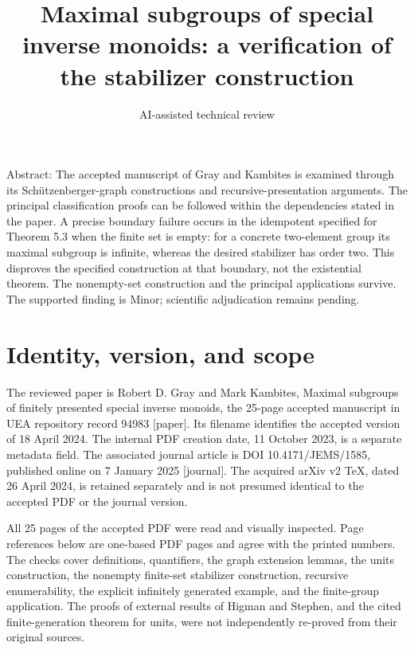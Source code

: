 \documentclass[10pt]{article}
\title{Maximal subgroups of special inverse monoids:
a verification of the stabilizer construction}
\author{AI-assisted technical review}
\date{}
\begin{document}
\maketitle
Abstract: The accepted manuscript of Gray and Kambites is examined through its Schützenberger-graph constructions and recursive-presentation arguments. The principal classification proofs can be followed within the dependencies stated in the paper. A precise boundary failure occurs in the idempotent specified for Theorem 5.3 when the finite set is empty: for a concrete two-element group its maximal subgroup is infinite, whereas the desired stabilizer has order two. This disproves the specified construction at that boundary, not the existential theorem. The nonempty-set construction and the principal applications survive. The supported finding is Minor; scientific adjudication remains pending.\par
\section*{Identity, version, and scope}
The reviewed paper is Robert D. Gray and Mark Kambites, Maximal subgroups of finitely presented special inverse monoids, the 25-page accepted manuscript in UEA repository record 94983 [paper]. Its filename identifies the accepted version of 18 April 2024. The internal PDF creation date, 11 October 2023, is a separate metadata field. The associated journal article is DOI 10.4171/JEMS/1585, published online on 7 January 2025 [journal]. The acquired arXiv v2 TeX, dated 26 April 2024, is retained separately and is not presumed identical to the accepted PDF or the journal version.\par
All 25 pages of the accepted PDF were read and visually inspected. Page references below are one-based PDF pages and agree with the printed numbers. The checks cover definitions, quantifiers, the graph extension lemmas, the units construction, the nonempty finite-set stabilizer construction, recursive enumerability, the explicit infinitely generated example, and the finite-group application. The proofs of external results of Higman and Stephen, and the cited finite-generation theorem for units, were not independently re-proved from their original sources.\par
\end{document}
